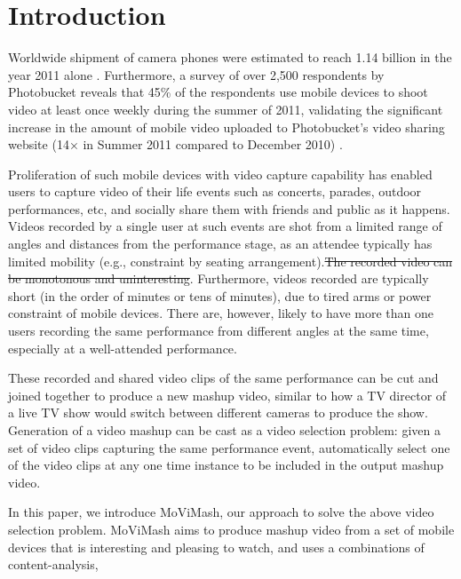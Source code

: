 \documentclass{sig-alternate-05-2015}
\providecommand{\DIFadd}[1]{{\protect\color{blue}\uwave{#1}}} %
\providecommand{\DIFdel}[1]{{\protect\color{red}\sout{#1}}}                      %
\providecommand{\DIFaddbegin}{} %
\providecommand{\DIFaddend}{} %
\providecommand{\DIFdelbegin}{} %
\providecommand{\DIFdelend}{} %
\begin{document}
%
%


\section{Introduction}
Worldwide shipment of camera phones were estimated to reach
1.14 billion in the year 2011 alone \cite{austin2002simplescalar}. Furthermore, a survey of
over 2,500 respondents by Photobucket reveals that 45\% of the respondents
use mobile devices to shoot video at least once weekly
during the summer of 2011, validating the significant increase in
the amount of mobile video uploaded to Photobucket’s video sharing
website (14× in Summer 2011 compared to December 2010) \cite{zinn1996quantum}.\par
Proliferation of such mobile devices with video capture capability
has enabled users to capture video of their life events such
as concerts, parades, outdoor performances, etc, and socially share
them with friends and public as it happens. Videos recorded by
a single user at such events are shot from a limited range of angles 
and distances from the performance stage, as an attendee typically
has limited mobility (e.g., constraint by seating arrangement).\DIFdelbegin \DIFdel{The recorded video can be monotonous and uninteresting}\DIFdelend \DIFaddbegin \DIFadd{My name is Sahil}\DIFaddend . Furthermore,
videos recorded are typically short (in the order of minutes
or tens of minutes), due to tired arms or power constraint of mobile
devices. There are, however, likely to have more than one users
recording the same performance from different angles at the same
time, especially at a well-attended performance.\par
These recorded and shared video clips of the same performance
can be cut and joined together to produce a new mashup video,
similar to how a TV director of a live TV show would switch between
different cameras to produce the show. Generation of a video
mashup can be cast as a video selection problem: given a set of
video clips capturing the same performance event, automatically
select one of the video clips at any one time instance to be included
in the output mashup video.\par
In this paper, we introduce MoViMash, our approach to solve
the above video selection problem. MoViMash aims to produce
mashup video from a set of mobile devices that is interesting and
pleasing to watch, and uses a combinations of content-analysis,
\end{document}
